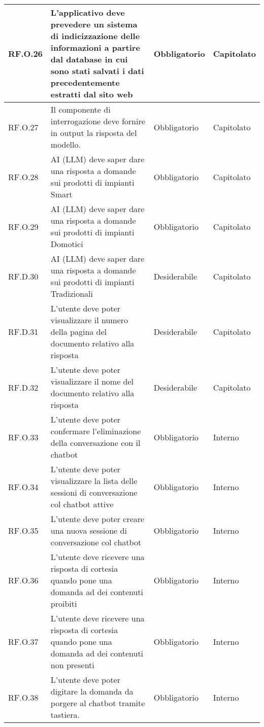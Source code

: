 \begin{longtable}{|C{2.7cm}|L{7.2cm}|C{2.7cm}|C{2cm}|}
         RF.O.26 & L’applicativo deve prevedere un sistema di indicizzazione delle informazioni a partire dal
        database in cui sono stati salvati i dati precedentemente estratti dal sito web
         & Obbligatorio & Capitolato \\
        \hline
        RF.O.27 & Il componente di interrogazione deve fornire in output la risposta del modello.
         & Obbligatorio & Capitolato \\
        \hline
        RF.O.28 & AI (LLM) deve saper dare una risposta a domande sui prodotti di impianti Smart
         & Obbligatorio & Capitolato \\
        \hline
        RF.O.29 & AI (LLM) deve saper dare una risposta a domande sui prodotti di impianti Domotici
         & Obbligatorio & Capitolato \\
        \hline
        RF.D.30 & AI (LLM) deve saper dare una risposta a domande sui prodotti di impianti Tradizionali
         & Desiderabile & Capitolato \\
        \hline
        RF.D.31 & L’utente deve poter visualizzare il numero della pagina del documento relativo alla risposta
         & Desiderabile & Capitolato \\
        \hline
        RF.D.32 & L’utente deve poter visualizzare il nome del documento relativo alla
        risposta
         & Desiderabile & Capitolato \\
        \hline
        RF.O.33 & L’utente deve poter confermare l'eliminazione della conversazione con il chatbot
         & Obbligatorio & Interno \\
        \hline
        RF.O.34 & L’utente deve poter visualizzare la lista delle
        sessioni di conversazione col chatbot attive
         & Obbligatorio & Interno \\
        \hline
        RF.O.35 & L’utente deve poter creare una nuova sessione di conversazione col chatbot
         & Obbligatorio & Interno \\
        \hline
        RF.O.36 & L’utente deve ricevere una risposta di cortesia quando pone una domanda ad dei contenuti proibiti
         & Obbligatorio & Interno \\
        \hline
        RF.O.37 & L’utente deve ricevere una risposta di cortesia quando pone una domanda ad dei contenuti non presenti
         & Obbligatorio & Interno \\
        \hline
        RF.O.38 & L’utente deve poter digitare la domanda da porgere al chatbot tramite tastiera.
         & Obbligatorio & Interno \\

\end{longtable}
